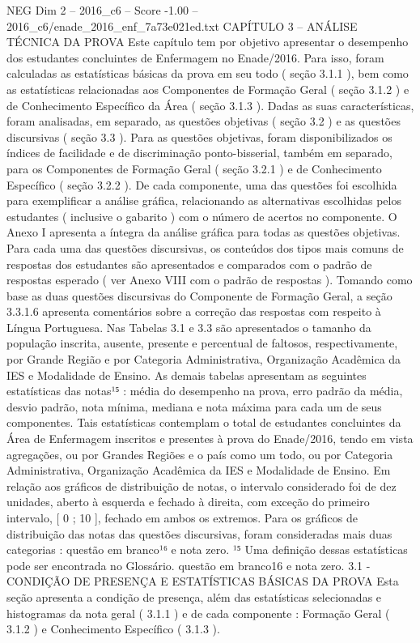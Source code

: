 \begin{textsample}{NEG Dim 2 – 2016\_c6 – Score -1.00 – 2016\_c6/enade\_2016\_enf\_7a73e021ed.txt}  \label{ex:f2_neg_224}
CAPÍTULO 3 – ANÁLISE TÉCNICA DA PROVA Este capítulo tem por objetivo apresentar o desempenho dos estudantes concluintes de Enfermagem no Enade/2016.
Para isso, foram calculadas as estatísticas básicas da prova em seu todo ( seção 3.1.1 ), bem como as estatísticas relacionadas aos Componentes de Formação Geral ( seção 3.1.2 ) e de Conhecimento Específico da Área ( seção 3.1.3 ).
Dadas as suas características, foram analisadas, em separado, as questões objetivas ( seção 3.2 ) e as questões discursivas ( seção 3.3 ).
Para as questões objetivas, foram disponibilizados os índices de facilidade e de discriminação ponto-bisserial, também em separado, para os Componentes de Formação Geral ( seção 3.2.1 ) e de Conhecimento Específico ( seção 3.2.2 ).
De cada componente, uma das questões foi escolhida para exemplificar a análise gráfica, relacionando as alternativas escolhidas pelos estudantes ( inclusive o gabarito ) com o número de acertos no componente.
O Anexo I apresenta a íntegra da análise gráfica para todas as questões objetivas.
Para cada uma das questões discursivas, os conteúdos dos tipos mais comuns de respostas dos estudantes são apresentados e comparados com o padrão de respostas esperado ( ver Anexo VIII com o padrão de respostas ).
Tomando como base as duas questões discursivas do Componente de Formação Geral, a seção 3.3.1.6 apresenta comentários sobre a correção das respostas com respeito à Língua Portuguesa.
Nas Tabelas 3.1 e 3.3 são apresentados o tamanho da população inscrita, ausente, presente e percentual de faltosos, respectivamente, por Grande Região e por Categoria Administrativa, Organização Acadêmica da IES e Modalidade de Ensino.
As demais tabelas apresentam as seguintes estatísticas das notas¹⁵ : média do desempenho na prova, erro padrão da média, desvio padrão, nota mínima, mediana e nota máxima para cada um de seus componentes.
Tais estatísticas contemplam o total de estudantes concluintes da Área de Enfermagem inscritos e presentes à prova do Enade/2016, tendo em vista agregações, ou por Grandes Regiões e o país como um todo, ou por Categoria Administrativa, Organização Acadêmica da IES e Modalidade de Ensino.
Em relação aos gráficos de distribuição de notas, o intervalo considerado foi de dez unidades, aberto à esquerda e fechado à direita, com exceção do primeiro intervalo, [ 0 ; 10 ], fechado em ambos os extremos.
Para os gráficos de distribuição das notas das questões discursivas, foram consideradas mais duas categorias : questão em branco¹⁶ e nota zero. ¹⁵ Uma definição dessas estatísticas pode ser encontrada no Glossário. questão em branco16 e nota zero. 3.1 - CONDIÇÃO DE PRESENÇA E ESTATÍSTICAS BÁSICAS DA PROVA Esta seção apresenta a condição de presença, além das estatísticas selecionadas e histogramas da nota geral ( 3.1.1 ) e de cada componente : Formação Geral ( 3.1.2 ) e Conhecimento Específico ( 3.1.3 ).

\end{textsample}
